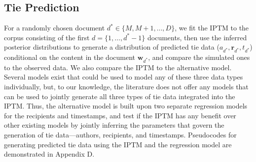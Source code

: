 \documentclass{article}
\begin{document}
\subsection{Tie Prediction}\label{subsec:Tie Prediction}
For a randomly chosen document $d^* \in \{M, M+1,\ldots, D\}$, we fit the IPTM to the corpus consisting of the first $d = \{1,\hdots,d^*-1\}$ documents, then use the inferred posterior distributions to generate a distribution of predicted tie data ($a_{d^*}, \boldsymbol{r}_{d^*}, t_{d^*}$) conditional on the content in the document $\boldsymbol{w}_{d^*}$, and compare the simulated ones to the observed data. We also compare the IPTM to the alternative model. Several models exist that could be used to model any of these three data types individually, but, to our knowledge, the literature does not offer any models that can be used to jointly generate all three types of tie data integrated into the IPTM. Thus, the alternative model is built upon two separate regression models for the recipients and timestamps, and test if the IPTM has any benefit over other existing models by jointly inferring the parameters that govern the generation of tie data---authors, recipients, and timestamps. Pseudocodes for generating predicted tie data using the IPTM and the regression model are demonstrated in Appendix D.
\end{document}
